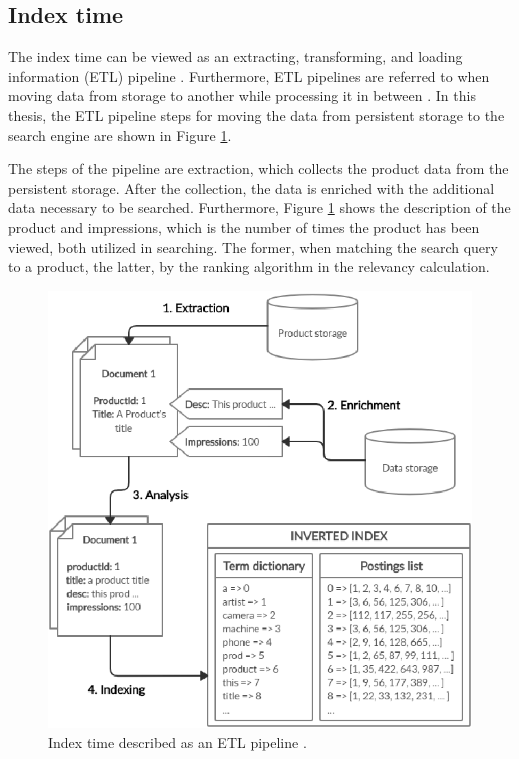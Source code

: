 \subsection{Index time}
\label{ss:indexTime}

The index time can be viewed as an extracting, transforming, and loading information (ETL) pipeline \cite{relevantSearch}.
Furthermore, ETL pipelines are referred to when moving data from storage to another while processing it in between \cite{relevantSearch}.
In this thesis, the ETL pipeline steps for moving the data from persistent storage to the search engine are shown in Figure \ref{fig:etlPipe}.

The steps of the pipeline are extraction, which collects the product data from the persistent storage.
After the collection, the data is enriched with the additional data necessary to be searched.
Furthermore, Figure \ref{fig:etlPipe} shows the description of the product and impressions, which is the number of times the product has been viewed, both utilized in searching. 
The former, when matching the search query to a product, the latter, by the ranking algorithm in the relevancy calculation.


\begin{figure}
    \centering
    \includegraphics[scale=1.5]{img/etl-pipeline.eps}
    \caption{Index time described as an ETL pipeline \cite{relevantSearch}.}
    \label{fig:etlPipe}
\end{figure}

